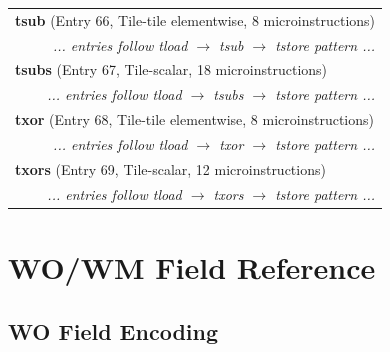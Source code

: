 \begin{longtable}{r r r r r r r r}
\multicolumn{8}{l}{\textbf{tsub} (Entry 66, Tile-tile elementwise, 8 microinstructions)} \\
  & \multicolumn{7}{r}{\textit{... entries follow tload $\rightarrow$ tsub $\rightarrow$ tstore pattern ...}} \\

\multicolumn{8}{l}{\textbf{tsubs} (Entry 67, Tile-scalar, 18 microinstructions)} \\
  & \multicolumn{7}{r}{\textit{... entries follow tload $\rightarrow$ tsubs $\rightarrow$ tstore pattern ...}} \\

\multicolumn{8}{l}{\textbf{txor} (Entry 68, Tile-tile elementwise, 8 microinstructions)} \\
  & \multicolumn{7}{r}{\textit{... entries follow tload $\rightarrow$ txor $\rightarrow$ tstore pattern ...}} \\

\multicolumn{8}{l}{\textbf{txors} (Entry 69, Tile-scalar, 12 microinstructions)} \\
  & \multicolumn{7}{r}{\textit{... entries follow tload $\rightarrow$ txors $\rightarrow$ tstore pattern ...}} \\

\bottomrule
\end{longtable}
\normalsize

\clearpage

\section{WO/WM Field Reference}

\subsection{WO Field Encoding}

